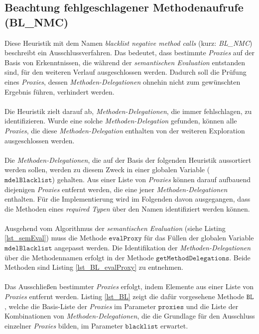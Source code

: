 \subsection{Beachtung fehlgeschlagener Methodenaufrufe (BL\_NMC)}\label{sec_bl_nmc}
Diese \Gls{Heuristik} mit dem Namen \emph{blacklist negative method calls} (kurz: \emph{BL\_NMC}) beschreibt ein Ausschlussverfahren. Das bedeutet, dass bestimmte \emph{Proxies} auf der Basis von Erkenntnissen, die während der \emph{semantischen Evaluation} entstanden sind, für den weiteren Verlauf ausgeschlossen werden. Dadurch soll die Prüfung eines \emph{Proxies}, dessen \emph{Methoden-Delegationen} ohnehin nicht zum gewünschten Ergebnis führen, verhindert werden.
\\\\
Die Heuristik zielt darauf ab, \emph{Methoden-Delegationen}, die immer fehlschlagen, zu identifizieren. Wurde eine solche \emph{Methoden-Delegation} gefunden, können alle \emph{Proxies}, die diese \emph{Methoden-Delegation} enthalten von der weiteren Exploration ausgeschlossen werden.
\\\\
Die \emph{Methoden-Delegationen}, die auf der Basis der folgenden \Gls{Heuristik} aussortiert werden sollen, werden zu diesem Zweck in einer globalen Variable ($\texttt{mdelBlacklist}$) gehalten. Aus einer Liste von \emph{Proxies} können darauf aufbauend diejenigen \emph{Proxies} entfernt werden, die eine jener \emph{Methoden-Delegationen} enthalten. Für die Implementierung wird im Folgenden davon ausgegangen, dass die Methoden eines \emph{required Typen} über den Namen identifiziert werden können.
\\\\
Ausgehend vom Algorithmus der \emph{semantischen Evaluation} (siehe Listing \ref{lst_semEval}) muss die Methode $\texttt{evalProxy}$ für das Füllen der globalen Variable $\texttt{mdelBlacklist}$ angepasst werden. Die Identifikation der \emph{Methoden-Delegationen} über die Methodennamen erfolgt in der Methode $\texttt{getMethodDelegations}$. Beide Methoden sind Listing \ref{lst_BL_evalProxy} zu entnehmen.
\\\\
Das Ausschließen bestimmter \emph{Proxies} erfolgt, indem Elemente aus einer Liste von \emph{Proxies} entfernt werden. Listing \ref{lst_BL} zeigt die dafür vorgesehene Methode $\texttt{BL}$, welche die Basis-Liste der \emph{Proxies} im Parameter $\texttt{proxies}$ und die Liste der Kombinationen von \emph{Methoden-Delegationen}, die die Grundlage für den Ausschluss einzelner \emph{Proxies} bilden, im Parameter $\texttt{blacklist}$ erwartet.
